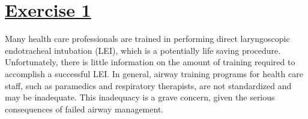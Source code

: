 \documentclass[a4paper,12pt]{article}\usepackage[]{graphicx}\usepackage[]{color}
\begin{document}

\begin{center}
\bigskip

\bigskip

\bigskip

\bigskip

\bigskip

\bigskip


\bigskip

\bigskip

\bigskip
\end{center}


% 

\setlength{\parskip}{1ex plus 0.5ex minus 0.2ex}
\parindent=0cm
\setlength{\parskip}{1ex plus 0.5ex minus 0.2ex}
\linespread{1.1}
\sloppy

\section{\underline{Exercise 1}}

Many health care professionals are trained in performing direct laryngoscopic endotracheal intubation (LEI), which is a potentially life saving procedure. Unfortunately, there is little information on the amount of training required to accomplish a successful LEI. In general, airway training programs for health care staff, such as paramedics and respiratory therapists, are not standardized and may be inadequate. This inadequacy is a grave concern, given the serious consequences of failed airway management.
\end{document}
